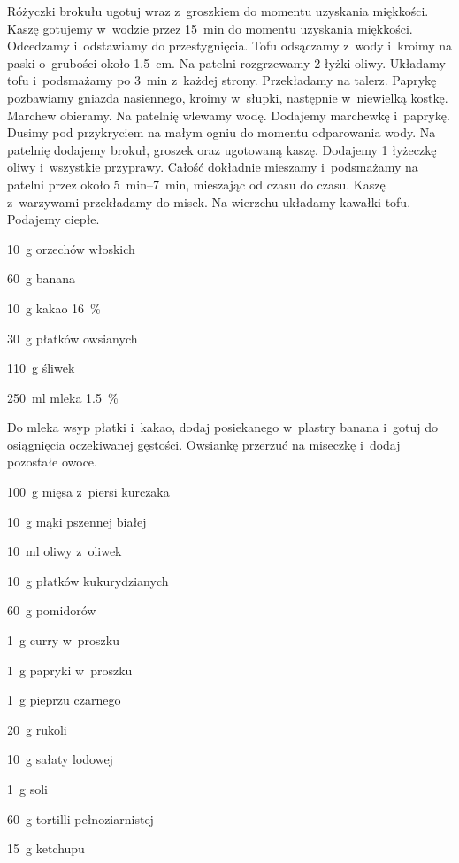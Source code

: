 \documentclass[../main.tex]{subfiles}
\begin{document}
Różyczki brokułu ugotuj wraz z~groszkiem do momentu uzyskania miękkości. Kaszę
gotujemy w~wodzie przez \qty{15}{\minute} do momentu uzyskania miękkości.
Odcedzamy i~odstawiamy do przestygnięcia. Tofu odsączamy z~wody i~kroimy na
paski o~grubości około \qty{1.5}{\centi\metre}. Na patelni rozgrzewamy \num{2}
łyżki oliwy. Układamy tofu i~podsmażamy po \qty{3}{\minute} z~każdej strony.
Przekładamy na talerz. Paprykę pozbawiamy gniazda nasiennego, kroimy w~słupki,
następnie w~niewielką kostkę. Marchew obieramy. Na patelnię wlewamy wodę.
Dodajemy marchewkę i~paprykę. Dusimy pod przykryciem na małym ogniu do momentu
odparowania wody. Na patelnię dodajemy brokuł, groszek oraz ugotowaną kaszę.
Dodajemy \num{1} łyżeczkę oliwy i~wszystkie przyprawy. Całość dokładnie
mieszamy i~podsmażamy na patelni przez około \qtyrange{5}{7}{\minute},
mieszając od czasu do czasu. Kaszę z~warzywami przekładamy do misek. Na
wierzchu układamy kawałki tofu. Podajemy ciepłe.


\begin{Ingred}
    \item \qty{10}{\gram} orzechów włoskich
    \item \qty{60}{\gram} banana
    \item \qty{10}{\gram} kakao \qty{16}{\percent}
    \item \qty{30}{\gram} płatków owsianych
    \item \qty{110}{\gram} śliwek
    \item \qty{250}{\milli\litre} mleka \qty{1.5}{\percent}
\end{Ingred}

Do mleka wsyp płatki i~kakao, dodaj posiekanego w~plastry banana i~gotuj do
osiągnięcia oczekiwanej gęstości. Owsiankę przerzuć na miseczkę i~dodaj
pozostałe owoce.


\begin{Ingred}
    \item \qty{100}{\gram} mięsa z~piersi kurczaka
    \item \qty{10}{\gram} mąki pszennej białej
    \item \qty{10}{\milli\litre} oliwy z~oliwek
    \item \qty{10}{\gram} płatków kukurydzianych
    \item \qty{60}{\gram} pomidorów
    \item \qty{1}{\gram} curry w~proszku
    \item \qty{1}{\gram} papryki w~proszku
    \item \qty{1}{\gram} pieprzu czarnego
    \item \qty{20}{\gram} rukoli
    \item \qty{10}{\gram} sałaty lodowej
    \item \qty{1}{\gram} soli
    \item \qty{60}{\gram} tortilli pełnoziarnistej
    \item \qty{15}{\gram} ketchupu
\end{Ingred}
\end{document}
